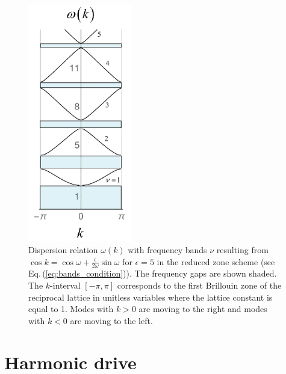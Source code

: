 \begin{figure}
    \includegraphics[width=0.4\textwidth, keepaspectratio]{figures/system/omegak.png}
    \caption{Dispersion relation $\omega(k)$ with frequency bands $\nu$ resulting from 
    $\cos k = \cos{\omega} + \frac{\epsilon}{2 \omega} \sin{\omega}$ for $\epsilon=5$
    in the reduced zone scheme (see Eq.\,(\ref{eq:bands_condition})). 
    The frequency gaps are shown shaded. The $k$-interval $[-\pi,\pi]$ 
    corresponds to the first Brillouin zone of the reciprocal lattice in 
    unitless variables where the lattice constant is equal to 1.
    Modes with $k>0$ are moving to the right and modes with $k<0$
    are moving to the left.}
    \label{fig:omegak}
\end{figure}


\section{Harmonic drive} \label{sec:hd}

